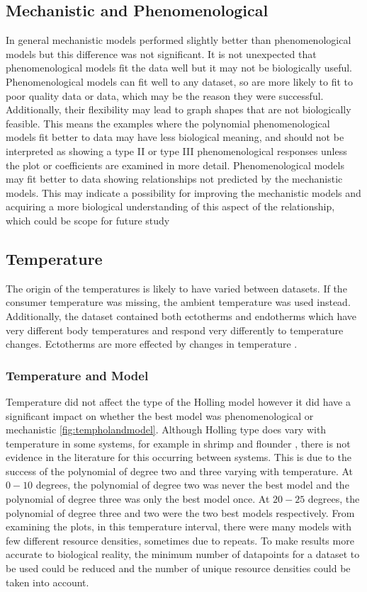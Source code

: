 \documentclass{article}
\begin{document}
\subsection{Mechanistic and Phenomenological }
In general mechanistic models performed slightly better than phenomenological models but this difference was not significant. It is not unexpected that phenomenological models fit the data well but it may not be biologically useful. Phenomenological models can fit well to any dataset, so are more likely to fit to poor quality data or data, which may be the reason they were successful. Additionally, their flexibility may lead to graph shapes that are not biologically feasible. This means the examples where the polynomial phenomenological models fit better to data may have less biological meaning, and should not be interpreted as showing a type II or type III phenomenological responses unless the plot or coefficients are examined in more detail. Phenomenological models may fit better to data showing relationships not predicted by the mechanistic models. This may indicate a possibility for improving the mechanistic models and acquiring a more biological understanding of this aspect of the relationship, which could be scope for future study
\subsection{Temperature}
The origin of the temperatures is likely to have varied between datasets. If the consumer temperature was missing, the ambient temperature was used instead. Additionally, the dataset contained both ectotherms and endotherms which have very different body temperatures and respond very differently to temperature changes. Ectotherms are more effected by changes in temperature \cite{Dell2014TemperatureStrategy}.
\subsubsection{Temperature and Model}
Temperature did not affect the type of the Holling model however it did have a significant impact on whether the best model was phenomenological or mechanistic \ref{fig:tempholandmodel}.  Although Holling type does vary with temperature in some systems, for example in shrimp and flounder \cite{Taylor2003EffectAmericanus}, there is not evidence in the literature for this occurring between systems. This is due to the success of the polynomial of degree two and three varying with temperature. At $0-10$ degrees, the polynomial of degree  two was never the best model and the polynomial of degree three was only the best model once. At $20-25$ degrees, the polynomial of degree three and two were the two best models respectively.  From examining the plots, in this temperature interval, there were many models with few different resource densities, sometimes due to repeats. To make results more accurate to biological reality, the minimum number of datapoints for a dataset to be used could be reduced and the number of unique resource densities could be taken into account.
\end{document}

